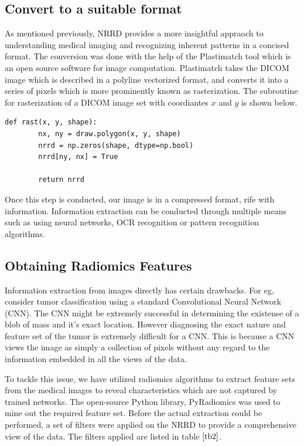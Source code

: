 \documentclass[10pt,journal,compsoc]{IEEEtran}
\begin{document}
\subsection{Convert to a suitable format}

As mentioned previously, NRRD provides a more insightful appraoch to understanding medical imaging and recognizing inherent patterns in a concised format. The conversion was done with the help of the Plastimatch tool which is an open source software for image computation. Plastimatch takes the DICOM image which is described in a polyline vectorized format, and converts it into a series of pixels which is more prominently known as rasterization. The subroutine for rasterization of a DICOM image set with coordiantes $x$ and $y$ is shown below.

\begin{verbatim}
def rast(x, y, shape):
        nx, ny = draw.polygon(x, y, shape)
        nrrd = np.zeros(shape, dtype=np.bool)
        nrrd[ny, nx] = True 

        return nrrd
\end{verbatim}

Once this step is conducted, our image is in a compressed format, rife with information. Information extraction can be conducted through multiple means such as using neural networks, OCR recognition or pattern recognition algorithms. 

\subsection{Obtaining Radiomics Features}

Information extraction from images directly has certain drawbacks. For eg, consider tumor classification using a standard Convolutional Neural Network (CNN). The CNN might be extremely successful in determining the existense of a blob of mass and it's exact location. However diagnosing the exact nature and feature set of the tumor is extremely difficult for a CNN. This is because a CNN views the image as simply a collection of pixels without any regard to the information embedded in all the views of the data. 

To tackle this issue, we have utilized radiomics algorithms to extract feature sets from the medical images to reveal characteristics which are not captured by trained networks. The open-source Python library, PyRadiomics was used to mine out the required feature set. Before the actual extraction could be performed, a set of filters were applied on the NRRD to provide a comprehensive view of the data. The filters applied are listed in table $\ref{tb2}$. 
\end{document}
